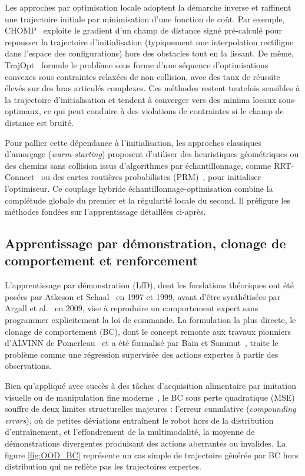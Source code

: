 Les approches par optimisation locale adoptent la démarche inverse et raffinent une trajectoire initiale par minimisation d'une fonction de coût. Par exemple, \ac{CHOMP}~\cite{Zucker2013Chomp} exploite le gradient d'un champ de distance signé pré-calculé pour repousser la trajectoire d'initialisation (typiquement une interpolation rectiligne dans l'espace des configurations) hors des obstacles tout en la lissant. De même, TrajOpt~\cite{Schulman2014Trajopt} formule le problème sous forme d'une séquence d'optimisations convexes sous contraintes relaxées de non-collision, avec des taux de réussite élevés sur des bras articulés complexes. Ces méthodes restent toutefois sensibles à la trajectoire d'initialisation et tendent à converger vers des minima locaux sous-optimaux, ce qui peut conduire à des violations de contraintes si le champ de distance est bruité.

Pour pallier cette dépendance à l'initialisation, les approches classiques d'amorçage (\textit{warm-starting}) proposent d'utiliser des heuristiques géométriques ou des chemins sans collision issus d'algorithmes par échantillonnage, comme \ac{RRT}-Connect~\cite{Kuffner2000Rrt} ou des cartes routières probabilistes (\ac{PRM})~\cite{Kavraki1996Probabilistic}, pour initialiser l'optimiseur. Ce couplage hybride échantillonnage-optimisation combine la complétude globale du premier et la régularité locale du second. Il préfigure les méthodes fondées sur l'apprentissage détaillées ci-après.

\subsection{Apprentissage par démonstration, clonage de comportement et renforcement}
L'apprentissage par démonstration (\ac{LfD}), dont les fondations théoriques ont été posées par Atkeson et Schaal~\cite{Atkeson1997Robot,Schaal1999Imitation} en 1997 et 1999, avant d'être synthétisées par Argall et al.~\cite{Argall2009Survey} en 2009, vise à reproduire un comportement expert sans programmer explicitement la loi de commande. La formulation la plus directe, le clonage de comportement (\ac{BC}), dont le concept remonte aux travaux pionniers d'ALVINN de Pomerleau~\cite{Pomerleau1989Alvinn} et a été formalisé par Bain et Sammut~\cite{Bain1995Framework}, traite le problème comme une régression supervisée des actions expertes à partir des observations.

Bien qu'appliqué avec succès à des tâches d'acquisition alimentaire par imitation visuelle ou de manipulation fine moderne~\cite{Zhao2023Fine,Sundaresan2022Visuo,Liu2024Adaptive}, le \ac{BC} sous perte quadratique (\ac{MSE}) souffre de deux limites structurelles majeures : l'erreur cumulative (\textit{compounding errors}), où de petites déviations entraînent le robot hors de la distribution d'entraînement, et l'effondrement de la multimodalité, la moyenne de démonstrations divergentes produisant des actions aberrantes ou invalides. La figure \ref{fig:OOD_BC} représente un cas simple de trajectoire générée par \ac{BC} hors distribution qui ne reflète pas les trajectoires expertes.

